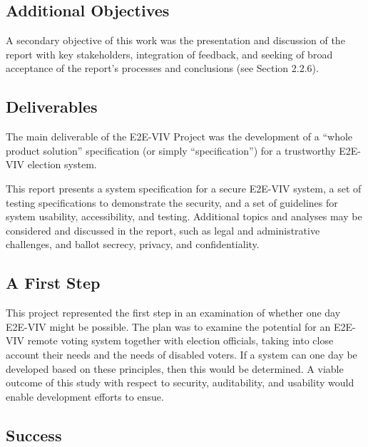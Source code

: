 \subsection{Additional Objectives}
\label{sec:addit-object}

A secondary objective of this work was the presentation and discussion
of the report with key stakeholders, integration of feedback, and
seeking of broad acceptance of the report's processes and conclusions
(see Section 2.2.6).

\subsection{Deliverables}
\label{sec:deliverables}

The main deliverable of the E2E-VIV Project was the development of a
``whole product solution'' specification (or simply ``specification'')
for a trustworthy E2E-VIV election system.

This report presents a system specification for a secure E2E-VIV
system, a set of testing specifications to demonstrate the security,
and a set of guidelines for system usability, accessibility, and
testing. Additional topics and analyses may be considered and
discussed in the report, such as legal and administrative challenges,
and ballot secrecy, privacy, and confidentiality.

\subsection{A First Step}
\label{sec:first-step}

This project represented the first step in an examination of whether
one day E2E-VIV might be possible. The plan was to examine the
potential for an E2E-VIV remote voting system together with election
officials, taking into close account their needs and the needs of
disabled voters. If a system can one day be developed based on these
principles, then this would be determined. A viable outcome of this
study with respect to security, auditability, and usability would
enable development efforts to ensue.

\subsection{Success}
\label{sec:success}

